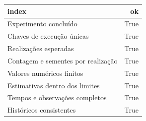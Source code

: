 \begin{tabular}{lr}
\toprule
index & ok \\
\midrule
Experimento concluído & True \\
Chaves de execução únicas & True \\
Realizações esperadas & True \\
Contagem e sementes por realização & True \\
Valores numéricos finitos & True \\
Estimativas dentro dos limites & True \\
Tempos e observações completos & True \\
Históricos consistentes & True \\
\bottomrule
\end{tabular}
